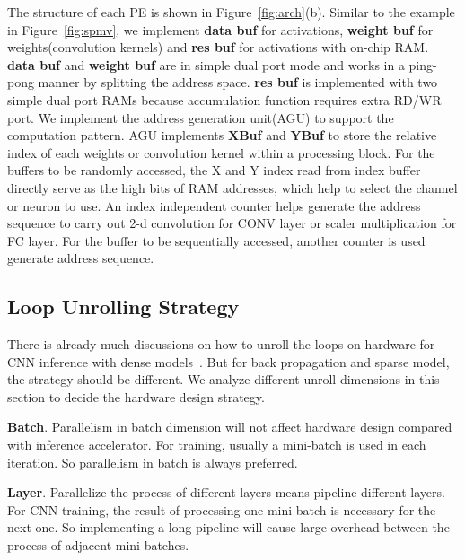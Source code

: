 The structure of each PE is shown in Figure~\ref{fig:arch}(b). Similar to the example in Figure~\ref{fig:spmv}, we implement {\bf{data buf}} for activations, {\bf{weight buf}} for weights(convolution kernels) and {\bf{res buf}} for activations with on-chip RAM. {\bf{data buf}} and {\bf{weight buf}} are in simple dual port mode and works in a ping-pong manner by splitting the address space. {\bf{res buf}} is implemented with two simple dual port RAMs because accumulation function requires extra RD/WR port. We implement the address generation unit(AGU) to support the computation pattern. AGU implements {\bf{XBuf}} and {\bf{YBuf}} to store the relative index of each weights or convolution kernel within a processing block. For the buffers to be randomly accessed, the X and Y index read from index buffer directly serve as the high bits of RAM addresses, which help to select the channel or neuron to use. An index independent counter helps generate the address sequence to carry out 2-d convolution for CONV layer or scaler multiplication for FC layer. For the buffer to be sequentially accessed, another counter is used generate address sequence.

\subsection{Loop Unrolling Strategy}\label{sec:hw_unroll}

There is already much discussions on how to unroll the loops on hardware for CNN inference with dense models~\cite{zhang2015optimizing,mao2017exploring}. But for back propagation and sparse model, the strategy should be different. We analyze different unroll dimensions in this section to decide the hardware design strategy.

{\bf{Batch}}. Parallelism in batch dimension will not affect hardware design compared with inference accelerator. For training, usually a mini-batch is used in each iteration. So parallelism in batch is always preferred.

{\bf{Layer}}. Parallelize the process of different layers means pipeline different layers. For CNN training, the result of processing one mini-batch is necessary for the next one. So implementing a long pipeline will cause large overhead between the process of adjacent mini-batches.


